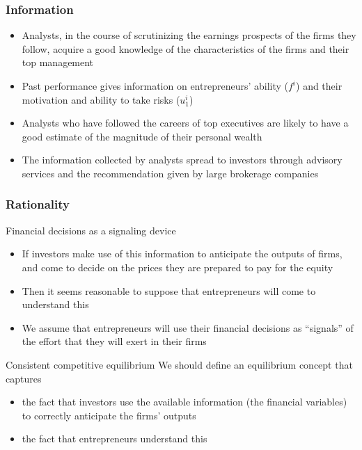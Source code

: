 \documentclass[blue]{beamer}
\theoremstyle{definition}
\theoremstyle{example}
\begin{document}
\begin{frame}\frametitle{Information}

\begin{itemize}
\item Analysts, in the course of scrutinizing the earnings prospects of the firms they follow, acquire a good knowledge of the characteristics of the firms and their top management
\item Past performance gives information on entrepreneurs' ability ($f^i$) and their motivation and ability to take risks ($u^i_1$)
\item Analysts who have followed the careers of top executives are likely to have a good estimate of the magnitude of their personal wealth
\item The information collected by analysts spread to investors through advisory services and the recommendation given by large brokerage companies
\end{itemize}


\end{frame}


\begin{frame}\frametitle{Rationality}

\begin{block}{Financial decisions as a signaling device}
\begin{itemize}
\item If investors make use of this information to anticipate the outputs of firms, and come to decide on the prices they are prepared to pay for the equity
\item Then it seems reasonable to suppose that entrepreneurs will come to understand this
\item We assume that entrepreneurs will use their financial decisions as ``signals'' of the effort that they will exert in their firms
\end{itemize}
\end{block}

\begin{block}{Consistent competitive equilibrium}
We should define an equilibrium concept that captures
\begin{itemize}
\item[(a)] the fact that investors use the available information (the financial variables) to correctly anticipate the firms' outputs
\item[(b)] the fact that entrepreneurs understand this
\end{itemize}
\end{block}

\end{frame}
\end{document}
